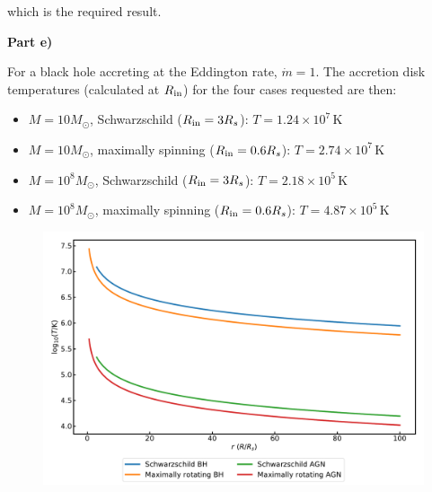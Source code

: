 \documentclass{article}
\newcommand{\Rin}{\ensuremath R_{\mathrm{in}}}
\newcommand{\mysection}[1]{{\large{\bf #1}}}
\begin{document}
which is the required result.

\vspace{\baselineskip}
\mysection{Part e)}

For a black hole accreting at the Eddington rate, $\dot{m}=1$. The accretion disk temperatures (calculated at $\Rin$) for the four cases requested are then:
\begin{itemize}
    \item $M=10M_\odot$, Schwarzschild ($\Rin=3R_s$): $T=1.24\times 10^7\,\mathrm{K}$
    \item $M=10M_\odot$, maximally spinning ($\Rin=0.6R_s$): $T=2.74\times 10^7\,\mathrm{K}$
    \item $M=10^8M_\odot$, Schwarzschild ($\Rin=3R_s$): $T=2.18\times 10^5\,\mathrm{K}$
    \item $M=10^8M_\odot$, maximally spinning ($\Rin=0.6R_s$): $T=4.87\times 10^5\,\mathrm{K}$
\end{itemize}
\newpage
\begin{figure}
  \centering
  \includegraphics[width=\textwidth]{parte_plot}
\end{figure}
\thispagestyle{empty}
\end{document}
